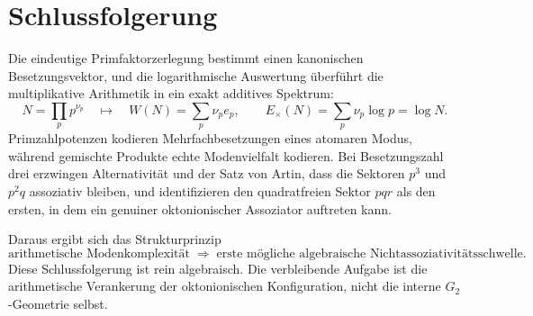 \documentclass[11pt,a4paper]{article}
\theoremstyle{definition}
\theoremstyle{remark}
\begin{document}
\section{Schlussfolgerung}
Die eindeutige Primfaktorzerlegung bestimmt einen kanonischen Besetzungsvektor, und die logarithmische Auswertung überführt die multiplikative Arithmetik in ein exakt additives Spektrum:
\[
\boxed{
N=\prod_pp^{\nu_p}
\quad\longmapsto\quad
W(N)=\sum_p\nu_pe_p,
\qquad
E_\times(N)=\sum_p\nu_p\log p=\log N.
}
\]
Primzahlpotenzen kodieren Mehrfachbesetzungen eines atomaren Modus, während gemischte Produkte echte Modenvielfalt kodieren. Bei Besetzungszahl drei erzwingen Alternativität und der Satz von Artin, dass die Sektoren $p^3$ und $p^2q$ assoziativ bleiben, und identifizieren den quadratfreien Sektor $pqr$ als den ersten, in dem ein genuiner oktonionischer Assoziator auftreten kann.

Daraus ergibt sich das Strukturprinzip
\[
\boxed{
\text{arithmetische Modenkomplexität}
\;\Longrightarrow\;
\text{erste mögliche algebraische Nichtassoziativitätsschwelle}.
}
\]
Diese Schlussfolgerung ist rein algebraisch. Die verbleibende Aufgabe ist die arithmetische Verankerung der oktonionischen Konfiguration, nicht die interne $G_2$-Geometrie selbst.
\end{document}
